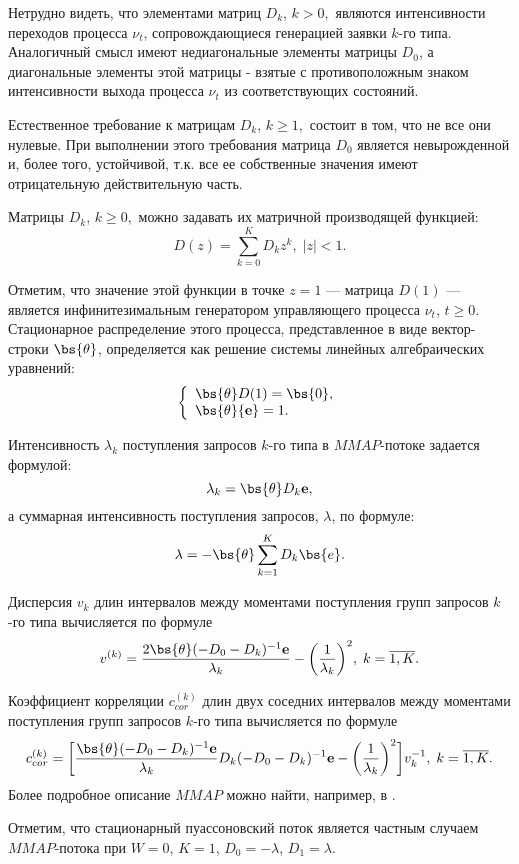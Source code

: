 \documentclass[12pt, a4paper]{article}
\begin{document}
	Нетрудно видеть, что элементами матриц $D_{k}$, $k>0,$ являются
	интенсивности переходов процесса $\nu_{t}$, сопровождающиеся
	генерацией заявки $k$-го типа. Аналогичный смысл имеют
	недиагональные элементы матрицы $D_{0}$, а диагональные элементы
	этой матрицы - взятые с противоположным знаком интенсивности выхода
	процесса $\nu_{t}$ из соответствующих состояний.
	
	Естественное требование к матрицам $D_k$, $k\ge1,$ состоит в том, что
	не все они нулевые. При выполнении этого требования матрица $D_0$
	является невырожденной и, более того, устойчивой, т.к. все ее
	собственные значения имеют отрицательную действительную часть.
	
	Матрицы $D_k$, $k\ge0,$ можно задавать их матричной производящей
	функцией:
	$$
	D(z)=\sum\limits_{k=0}^{K}D_{k}z^k, \; |z|<1.
	$$
	
	Отметим, что значение этой функции в точке $z=1$ --- матрица $D(1)$
	--- является инфинитезимальным генератором управляющего процесса
	$\nu_t$, $t\ge0$. Стационарное распределение этого процесса,
	представленное в виде вектор-строки $\bs{\theta}$, определяется как
	решение системы линейных алгебраических уравнений:
	$$
	\left\{\begin{array}{l}\bs{\theta}D(1)=\bs{0},\\
	\bs{\theta}{\bf e}=1.\end{array}\right.
	$$
	
	Интенсивность $\lambda_{k}$ поступления запросов $k$-го типа
	в $MMAP$-потоке задается формулой:
	$$
	\lambda_{k}=\bs{\theta}D_{k}{\bf e},
	$$
	а суммарная  интенсивность поступления запросов, $\lambda$,
	по формуле:
	$$
	\lambda=-\bs{\theta}\sum\limits_{k=1}^K D_{k}\bs{e}.
	$$
	
	
	
	Дисперсия $v_k$ длин интервалов между моментами  поступления групп
	запросов $k$-го типа вычисляется по формуле
	$$
	v^{(k)} = \frac{2\bs{\theta}(-D_0-
		D_k)^{-1}{\bf e}}{\lambda_k} -
	\biggl(\frac{1}{\lambda_k}\biggr)^2,\; k=\overline{1,K}.
	$$
	
	
	Коэффициент корреляции  $c_{cor}^{(k)}$ длин двух соседних
	интервалов между моментами  поступления групп запросов $k$-го типа
	вычисляется по формуле
	$$
	c_{cor}^{(k)}=\biggl[\frac{\bs{\theta}(-D_0-
		D_k)^{-1}{\bf e}}{\lambda_k} D_k(-D_0-D_k)^{-1}{\bf
		e}-\biggl(\frac{1}{\lambda_k}\biggr)^2\biggr]v_k^{-1},\;
	k=\overline{1,K}.
	$$
	Более подробное описание $MMAP$  можно найти, например, в \cite{he}.
	
	Отметим, что стационарный пуассоновский поток является частным случаем
	$MMAP$-потока при $ W=0$, $K=1$, $D_0=-\lambda$, $D_1=\lambda$.
	
\end{document}
